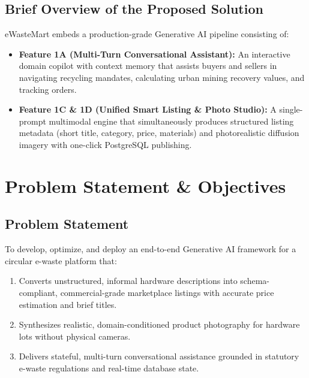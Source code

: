\documentclass[12pt,a4paper]{article}
\begin{document}
\subsection{Brief Overview of the Proposed Solution}
eWasteMart embeds a production-grade Generative AI pipeline consisting of:
\begin{itemize}
    \item \textbf{Feature 1A (Multi-Turn Conversational Assistant):} An interactive domain copilot with context memory that assists buyers and sellers in navigating recycling mandates, calculating urban mining recovery values, and tracking orders.
    \item \textbf{Feature 1C \& 1D (Unified Smart Listing \& Photo Studio):} A single-prompt multimodal engine that simultaneously produces structured listing metadata (short title, category, price, materials) and photorealistic diffusion imagery with one-click PostgreSQL publishing.
\end{itemize}

\section{Problem Statement \& Objectives}

\subsection{Problem Statement}
To develop, optimize, and deploy an end-to-end Generative AI framework for a circular e-waste platform that:
\begin{enumerate}
    \item Converts unstructured, informal hardware descriptions into schema-compliant, commercial-grade marketplace listings with accurate price estimation and brief titles.
    \item Synthesizes realistic, domain-conditioned product photography for hardware lots without physical cameras.
    \item Delivers stateful, multi-turn conversational assistance grounded in statutory e-waste regulations and real-time database state.
\end{enumerate}
\end{document}
